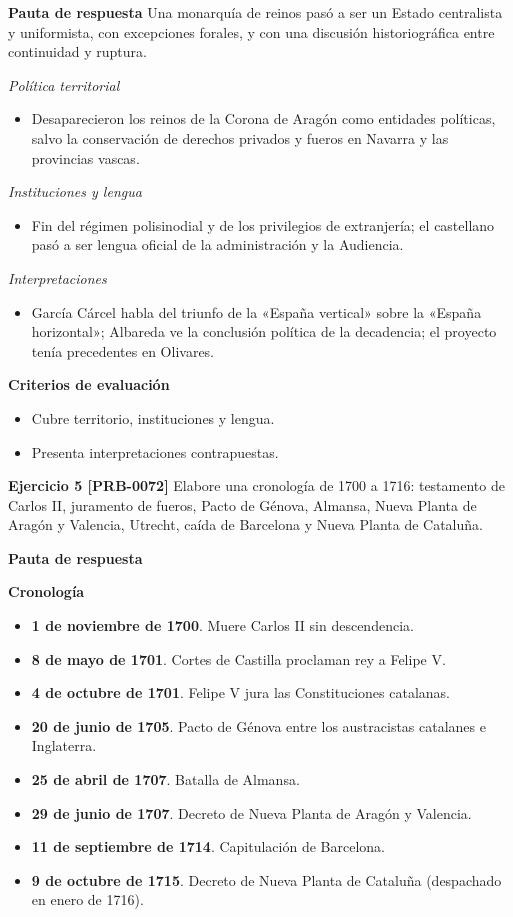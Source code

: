 \documentclass{book}
\begin{document}
\noindent\textbf{Pauta de respuesta}
Una monarquía de reinos pasó a ser un Estado centralista y uniformista, con excepciones forales, y con una discusión historiográfica entre continuidad y ruptura.


\noindent\textit{Política territorial}
\begin{itemize}
\item Desaparecieron los reinos de la Corona de Aragón como entidades políticas, salvo la conservación de derechos privados y fueros en Navarra y las provincias vascas.
\end{itemize}

\noindent\textit{Instituciones y lengua}
\begin{itemize}
\item Fin del régimen polisinodial y de los privilegios de extranjería; el castellano pasó a ser lengua oficial de la administración y la Audiencia.
\end{itemize}

\noindent\textit{Interpretaciones}
\begin{itemize}
\item García Cárcel habla del triunfo de la «España vertical» sobre la «España horizontal»; Albareda ve la conclusión política de la decadencia; el proyecto tenía precedentes en Olivares.
\end{itemize}

\noindent\textbf{Criterios de evaluación}
\begin{itemize}
\item Cubre territorio, instituciones y lengua.
\item Presenta interpretaciones contrapuestas.
\end{itemize}

\noindent\textbf{Ejercicio 5 [PRB-0072]}
Elabore una cronología de 1700 a 1716: testamento de Carlos II, juramento de fueros, Pacto de Génova, Almansa, Nueva Planta de Aragón y Valencia, Utrecht, caída de Barcelona y Nueva Planta de Cataluña.


\noindent\textbf{Pauta de respuesta}

\noindent\textbf{Cronología}
\begin{itemize}
\item \textbf{1 de noviembre de 1700}. Muere Carlos II sin descendencia.
\item \textbf{8 de mayo de 1701}. Cortes de Castilla proclaman rey a Felipe V.
\item \textbf{4 de octubre de 1701}. Felipe V jura las Constituciones catalanas.
\item \textbf{20 de junio de 1705}. Pacto de Génova entre los austracistas catalanes e Inglaterra.
\item \textbf{25 de abril de 1707}. Batalla de Almansa.
\item \textbf{29 de junio de 1707}. Decreto de Nueva Planta de Aragón y Valencia.
\item \textbf{11 de septiembre de 1714}. Capitulación de Barcelona.
\item \textbf{9 de octubre de 1715}. Decreto de Nueva Planta de Cataluña (despachado en enero de 1716).
\end{itemize}
\end{document}
